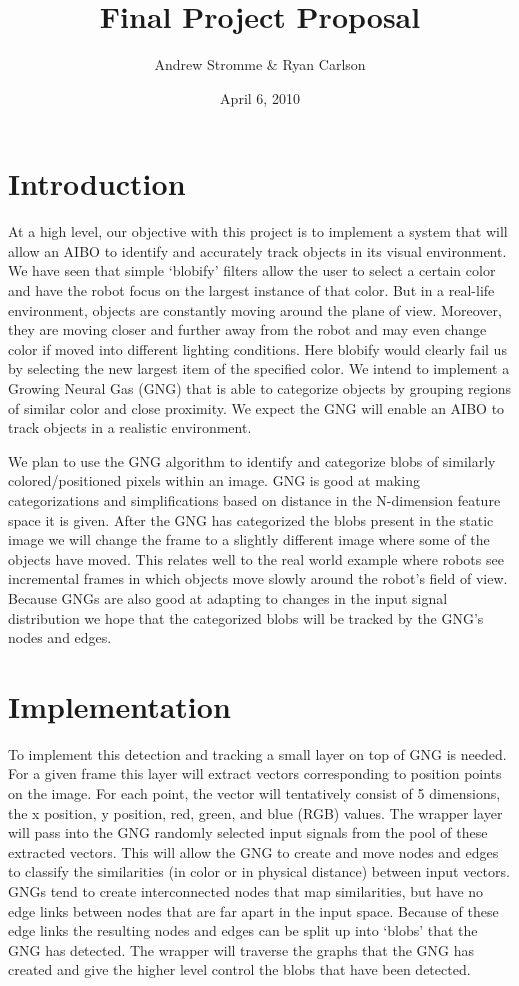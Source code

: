 \documentclass{article}
\begin{document}
\title{Final Project Proposal}
\author{Andrew Stromme \& Ryan Carlson}
\date{April 6, 2010}
\maketitle

\section{Introduction}

At a high level, our objective with this project is to implement a system that will allow an AIBO to identify and accurately track objects in its visual environment. We have seen that simple `blobify' filters allow the user to select a certain color and have the robot focus on the largest instance of that color. But in a real-life environment, objects are constantly moving around the plane of view. Moreover, they are moving closer and further away from the robot and may even change color if moved into different lighting conditions. Here blobify would clearly fail us by selecting the new largest item of the specified color. We intend to implement a Growing Neural Gas (GNG) that is able to categorize objects by grouping regions of similar color and close proximity. We expect the GNG will enable an AIBO to track objects in a realistic environment.

We plan to use the GNG algorithm to identify and categorize blobs of similarly colored/positioned pixels within an image. GNG is good at making categorizations and simplifications based on distance in the N-dimension feature space it is given. After the GNG has categorized the blobs present in the static image we will change the frame to a slightly different image where some of the objects have moved. This relates well to the real world example where robots see incremental frames in which objects move slowly around the robot's field of view. Because GNGs are also good at adapting to changes in the input signal distribution we hope that the categorized blobs will be tracked by the GNG's nodes and edges.

\section{Implementation}
To implement this detection and tracking a small layer on top of GNG is needed. For a given frame this layer will extract vectors corresponding to position points on the image. For each point, the vector will tentatively consist of 5 dimensions, the x position, y position, red, green, and blue (RGB) values. The wrapper layer will pass into the GNG randomly selected input signals from the pool of these extracted vectors. This will allow the GNG to create and move nodes and edges to classify the similarities (in color or in physical distance) between input vectors. GNGs tend to create interconnected nodes that map similarities, but have no edge links between nodes that are far apart in the input space. Because of these edge links the resulting nodes and edges can be split up into `blobs' that the GNG has detected. The wrapper will traverse the graphs that the GNG has created and give the higher level control the blobs that have been detected.
\end{document}
